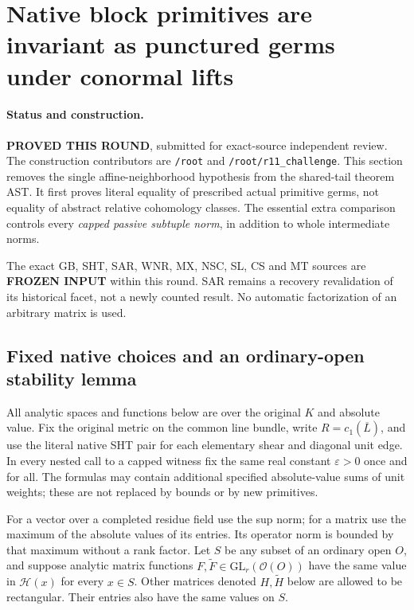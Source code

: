 \section{Native block primitives are invariant as punctured germs under conormal lifts}
\label{sec:r11-native-conormal-germ-gluing}

\paragraph{Status and construction.}
\textbf{PROVED THIS ROUND}, submitted for exact-source independent
review.  The construction contributors are \texttt{/root} and
\texttt{/root/r11\_challenge}.  This section removes the single
affine-neighborhood hypothesis from the shared-tail theorem AST.
It first proves literal equality of prescribed actual primitive
germs, not equality of abstract relative cohomology classes.
The essential extra comparison controls every \emph{capped passive
subtuple norm}, in addition to whole intermediate norms.

The exact GB, SHT, SAR, WNR, MX, NSC, SL, CS and MT sources are
\textbf{FROZEN INPUT} within this round.  SAR remains a recovery
revalidation of its historical facet, not a newly counted result.
No automatic factorization of an arbitrary matrix is used.

\subsection{Fixed native choices and an ordinary-open stability lemma}

All analytic spaces and functions below are over the original $K$
and absolute value.  Fix the original metric on the common line
bundle, write $R=c_1(\overline L)$, and use the literal native
SHT pair for each elementary shear and diagonal unit edge.
In every nested call to a capped witness fix the same real
constant $\varepsilon>0$ once and for all.  The formulas may
contain additional specified absolute-value sums of unit weights;
these are not replaced by bounds or by new primitives.

For a vector over a completed residue field use the sup norm;
for a matrix use the maximum of the absolute values of its entries.
Its operator norm is bounded by that maximum without a rank factor.
Let $S$ be any subset of an ordinary open $O$, and suppose analytic
matrix functions $F,\widetilde F\in\mathrm{GL}_r(\mathcal O(O))$
have the same value in $\mathscr H(x)$ for every $x\in S$.
Other matrices denoted $H,\widetilde H$ below are allowed to be
rectangular.  Their entries also have the same values on $S$.

